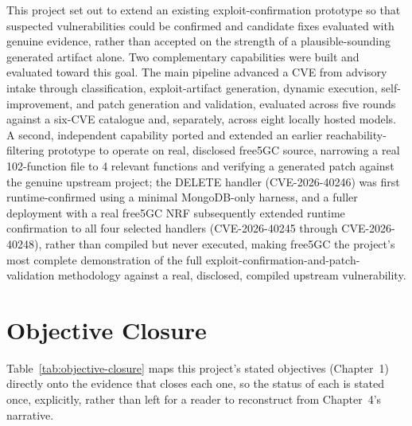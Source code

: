 \documentclass[12pt,a4paper]{report}
\begin{document}
This project set out to extend an existing exploit-confirmation prototype so that suspected vulnerabilities could be confirmed and candidate fixes evaluated with genuine evidence, rather than accepted on the strength of a plausible-sounding generated artifact alone. Two complementary capabilities were built and evaluated toward this goal. The main pipeline advanced a CVE from advisory intake through classification, exploit-artifact generation, dynamic execution, self-improvement, and patch generation and validation, evaluated across five rounds against a six-CVE catalogue and, separately, across eight locally hosted models. A second, independent capability ported and extended an earlier reachability-filtering prototype to operate on real, disclosed free5GC source, narrowing a real 102-function file to 4 relevant functions and verifying a generated patch against the genuine upstream project; the DELETE handler (CVE-2026-40246) was first runtime-confirmed using a minimal MongoDB-only harness, and a fuller deployment with a real free5GC NRF subsequently extended runtime confirmation to all four selected handlers (CVE-2026-40245 through CVE-2026-40248), rather than compiled but never executed, making free5GC the project's most complete demonstration of the full exploit-confirmation-and-patch-validation methodology against a real, disclosed, compiled upstream vulnerability.

\section{Objective Closure}

Table~\ref{tab:objective-closure} maps this project's stated objectives (Chapter~1) directly onto the evidence that closes each one, so the status of each is stated once, explicitly, rather than left for a reader to reconstruct from Chapter~4's narrative.
\end{document}

